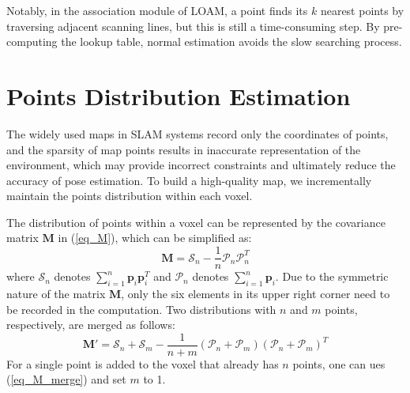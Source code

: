 \documentclass[letterpaper, 10 pt, conference]{ieeeconf}  %
\begin{document}
Notably, in the association module of LOAM, a point finds its $k$ nearest points by traversing adjacent scanning lines, but this is still a time-consuming step.
By pre-computing the lookup table, normal estimation avoids the slow searching process.

\section{Points Distribution Estimation}
\label{sec:distribution_estimation}
The widely used maps in SLAM systems record only the coordinates of points, and the sparsity of map points results in inaccurate representation of the environment, which may provide incorrect constraints and ultimately reduce the accuracy of pose estimation.
To build a high-quality map, we incrementally maintain the points distribution within each voxel.

The distribution of points within a voxel can be represented by the covariance matrix $\boldsymbol{M}$ in (\ref{eq_M}), which can be simplified as:
\begin{equation}
        \boldsymbol{M} = \mathcal{S}_n - \frac{1}{n} \mathcal{P}_n \mathcal{P}_n^T
        \label{eq_M_simp}
\end{equation}
where $\mathcal{S}_n $ denotes $\sum_{i = 1}^{n}\boldsymbol{p}_i \boldsymbol{p}_i^T$ and $\mathcal{P}_n$ denotes $\sum_{i = 1}^{n}\boldsymbol{p}_i $.
Due to the symmetric nature of the matrix $\boldsymbol{M}$, only the six elements in its upper right corner need to be recorded in the computation.
Two distributions with $n$ and $m$ points, respectively, are merged as follows:
\begin{equation}
        \boldsymbol{M}' = \mathcal{S}_n + \mathcal{S}_m - \frac{1}{n + m}(\mathcal{P}_n + \mathcal{P}_m)(\mathcal{P}_n + \mathcal{P}_m)^T
        \label{eq_M_merge}
\end{equation}
For a single point is added to the voxel that already has $n$ points, one can ues (\ref{eq_M_merge}) and set $m$ to 1.
\end{document}
